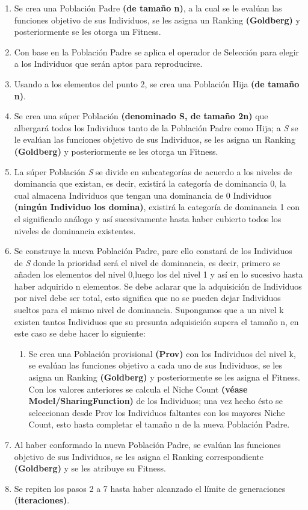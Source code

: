 \documentclass[class=report, crop=false]{standalone}
\begin{document}
\begin{enumerate}
\item Se crea una Población Padre \textbf{(de tamaño n)}, a la cual se le evalúan las funciones objetivo de sus Individuos, se les asigna un Ranking \textbf{(Goldberg)} y posteriormente se les otorga un Fitness.
\item Con base en la Población Padre se aplica el operador de Selección para elegir a los Individuos que serán aptos para reproducirse.
\item Usando a los elementos del punto 2, se crea una Población Hija \textbf{(de tamaño n)}.
\item Se crea una súper Población \textbf{(denominado S, de tamaño 2n)} que albergará todos los Individuos tanto de la Población Padre como Hija; a \emph{S} se le evalúan las funciones objetivo de sus Individuos, se les asigna un Ranking \textbf{(Goldberg)} y posteriormente se les otorga un Fitness.
\item La súper Población \emph{S} se divide en subcategorías de acuerdo a los niveles de dominancia que existan, es decir, existirá la categoría de dominancia 0, la cual almacena Individuos que tengan una dominancia de 0 Individuos \textbf{(ningún Individuo los domina)}, existirá la categoría de dominancia 1 con el significado análogo y así sucesivamente hasta haber cubierto todos los niveles de dominancia existentes.
\item Se construye la nueva Población Padre, pare ello constará de los Individuos de \emph{S} donde la prioridad será el nivel de dominancia, es decir, primero se añaden los elementos del nivel 0,luego los del nivel 1 y así en lo sucesivo hasta haber adquirido n elementos.
Se debe aclarar que la adquisición de Individuos por nivel debe ser total, esto significa que no se pueden dejar Individuos sueltos para el mismo nivel de dominancia.\break
Supongamos que a un nivel k existen tantos Individuos que su presunta adquisición supera el tamaño n, en este caso se debe hacer lo siguiente:
      \begin{enumerate}
      \item Se crea una Población provisional \textbf{(Prov)} con los Individuos del nivel k, se evalúan las funciones objetivo a cada uno de sus Individuos, se les asigna un Ranking \textbf{(Goldberg)} y posteriormente se les asigna el Fitness.\break
            Con los valores anteriores se calcula el Niche Count \textbf{(véase Model/}\break\textbf{SharingFunction)} de los Individuos; una vez hecho ésto se seleccionan desde Prov los Individuos faltantes con los mayores Niche Count, esto hasta completar el tamaño n de la nueva Población Padre.
      \end{enumerate}
\item Al haber conformado la nueva Población Padre, se evalúan las funciones objetivo de sus Individuos, se les asigna el Ranking correspondiente \textbf{(Goldberg)} y se les atribuye su Fitness.
\item Se repiten los pasos 2 a 7 hasta haber alcanzado el límite de generaciones \textbf{(iteraciones)}.
\end{enumerate}
\end{document}

